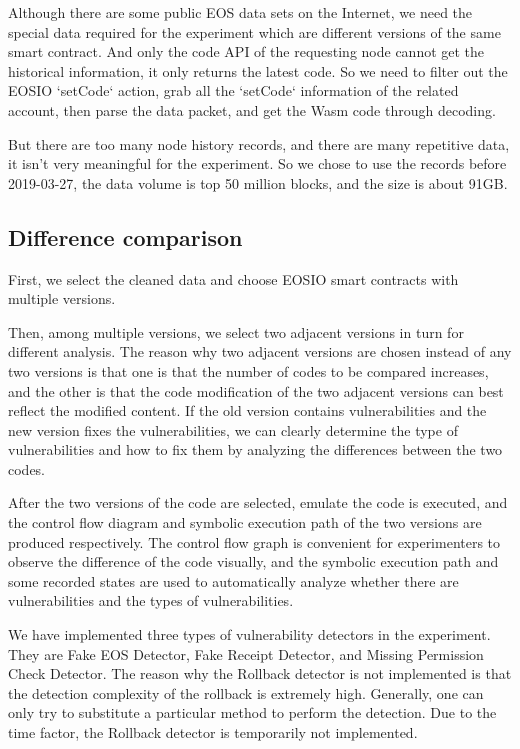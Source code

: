 \documentclass[a4paper, 10pt, conference, twocolumn]{ieeeconf}       %
\begin{document}
Although there are some public EOS data sets on the Internet,
we need the special data required for the experiment which are different versions of the same smart contract.
And only the code API of the requesting node cannot get the historical information,
it only returns the latest code.
So we need to filter out the EOSIO `setCode` action, grab all the `setCode` information of the related account, then parse the data packet, and get the Wasm code through decoding.

But there are too many node history records,
and there are many repetitive data,
it isn't very meaningful for the experiment.
So we chose to use the records before 2019-03-27,
the data volume is top 50 million blocks,
and the size is about 91GB.

\subsection{Difference comparison}
First, we select the cleaned data and choose EOSIO smart contracts with multiple versions.

Then, among multiple versions,
we select two adjacent versions in turn for different analysis.
The reason why two adjacent versions are chosen instead of any two versions is that one is that the number of codes to be compared increases,
and the other is that the code modification of the two adjacent versions can best reflect the modified content.
If the old version contains vulnerabilities and the new version fixes the vulnerabilities,
we can clearly determine the type of vulnerabilities and how to fix them by analyzing the differences between the two codes.

After the two versions of the code are selected,
emulate the code is executed,
and the control flow diagram and symbolic execution path of the two versions are produced respectively.
The control flow graph is convenient for experimenters to observe the difference of the code visually,
and the symbolic execution path and some recorded states are used to automatically analyze whether there are vulnerabilities and the types of vulnerabilities.

We have implemented three types of vulnerability detectors in the experiment.
They are Fake EOS Detector, Fake Receipt Detector,
and Missing Permission Check Detector.
The reason why the Rollback detector is not implemented is that the detection complexity of the rollback is extremely high.
Generally, one can only try to substitute a particular method to perform the detection.
Due to the time factor,
the Rollback detector is temporarily not implemented.
\end{document}
